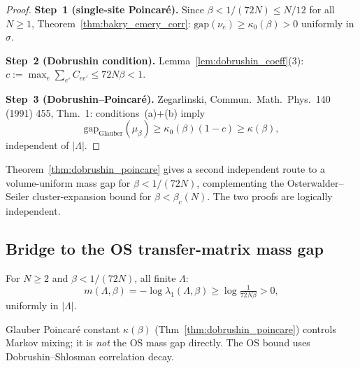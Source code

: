 \begin{proof}
\textbf{Step~1 (single-site Poincar\'{e}).}
Since $\beta<1/(72N)\le N/12$ for all $N\ge1$,
Theorem~\ref{thm:bakry_emery_corr}: $\mathrm{gap}(\nu_e)\ge\kappa_0(\beta)>0$ uniformly in $\sigma$.

\textbf{Step~2 (Dobrushin condition).}
Lemma~\ref{lem:dobrushin_coeff}(3): $c:=\max_e\sum_{e'}C_{ee'}\le72N\beta<1$.

\textbf{Step~3 (Dobrushin--Poincar\'{e}).}
Zegarlinski, Commun.\ Math.\ Phys.\ 140 (1991) 455, Thm.~1:
conditions~(a)+(b) imply
\[  \mathrm{gap}_{\mathrm{Glauber}}(\mu_{\beta})\ge\kappa_0(\beta)(1-c)\ge\kappa(\beta), \]
independent of $|\Lambda|$.
\end{proof}

\begin{remark}
Theorem~\ref{thm:dobrushin_poincare} gives a second independent route to a
volume-uniform mass gap for $\beta<1/(72N)$, complementing the Osterwalder--Seiler
cluster-expansion bound for $\beta<\beta_c(N)$. The two proofs are logically independent.
\end{remark}

\subsection{Bridge to the OS transfer-matrix mass gap}
\label{ssec:gap_bridge}

\begin{theorem}
\label{thm:dp_to_os}
For $N\ge2$ and $\beta<1/(72N)$, all finite $\Lambda$:
\begin{equation}
\label{eq:dp_os}
m(\Lambda,\beta)=-\log\lambda_1(\Lambda,\beta)\ge\log\tfrac{1}{72N\beta}>0,
\end{equation}
uniformly in $|\Lambda|$.
\end{theorem}
\begin{remark}
Glauber Poincar\'e constant $\kappa(\beta)$ (Thm~\ref{thm:dobrushin_poincare})
controls Markov mixing; it is \emph{not} the OS mass gap directly.
The OS bound uses Dobrushin--Shlosman correlation decay.
\end{remark}

